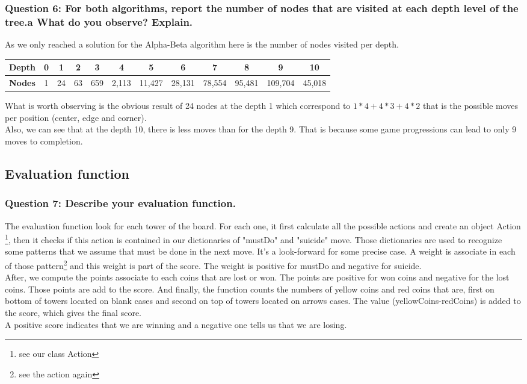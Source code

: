 \documentclass[a4paper,10pt]{article}
\begin{document}
			\subsubsection{Question 6: For both algorithms, report the number of nodes that are visited at each depth level of the tree.a What do you observe? Explain.}
				As we only reached a solution for the Alpha-Beta algorithm here is the number of nodes visited per depth.
				\begin{center}
					\begin{tabular}{|c|c|c|c|c|c|c|c|c|c|c|c|}
						\hline 
						\textbf{Depth} & 0 & 1 & 2 & 3 & 4 & 5 & 6 & 7 & 8 & 9 & 10 \\ 
						\hline 
						\textbf{Nodes} & 1 & 24 & 63 & 659 & 2,113 & 11,427 & 28,131 & 78,554 & 95,481 & 109,704 & 45,018 \\ 
						\hline 
					\end{tabular} 
				\end{center}
				What is worth observing is the obvious result of 24 nodes at the depth 1 which correspond to $ 1*4 + 4*3 + 4*2 $ that is the possible moves per position (center, edge and corner).\\
				Also, we can see that at the depth 10, there is less moves than for the depth 9. That is because some game progressions can lead to only 9 moves to completion.
			
			\subsection{Evaluation function}
				\subsubsection{Question 7: Describe your evaluation function.}
				The evaluation function look for each tower of the board. For each one, it first calculate all the possible actions and create an object Action \footnote{see our class Action}, then it checks if this action is contained in our dictionaries of "mustDo" and "suicide" move. Those dictionaries are used to recognize some patterns that we assume that must be done in the next move. It's a look-forward for some precise case. A weight is associate in each of those pattern\footnote{see the action again} and this weight is part of the score. The weight is positive for mustDo and negative for suicide.\\
After, we compute the points associate to each coins that are lost or won. The points are positive for won coins and negative for the lost coins. Those points are add to the score.
And finally, the function counts the numbers of yellow coins and red coins that are, first on bottom of towers located on blank cases and second on top of towers located on arrows cases. The value (yellowCoins-redCoins) is added to the score, which gives the final score.\\
A positive score indicates that we are winning and a negative one tells us that we are losing.
\end{document}
